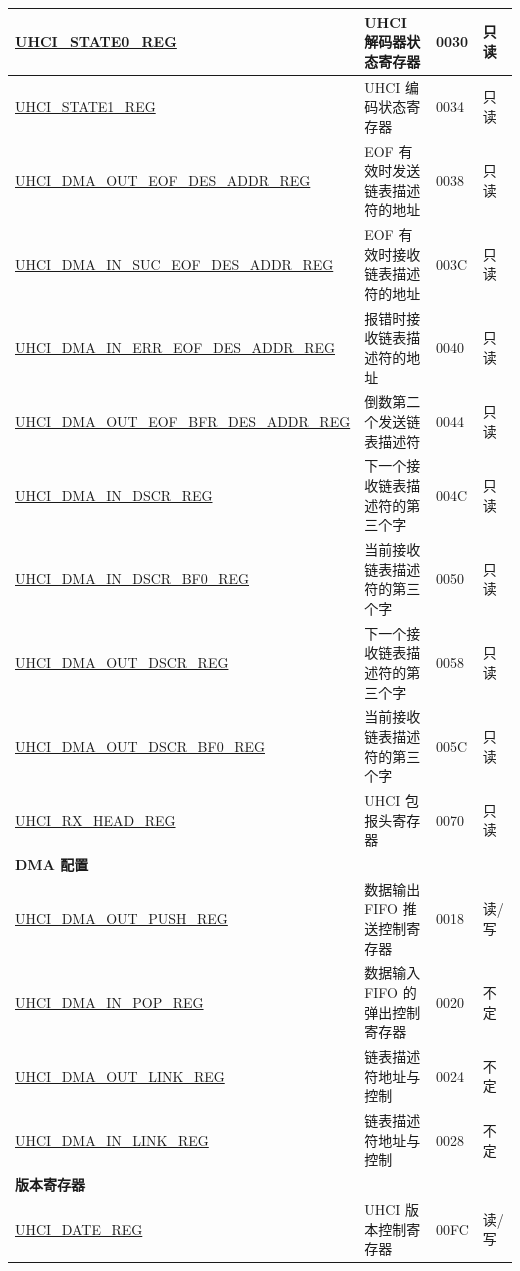 \begin{longtable}{ | p{6cm} | p{7.2cm} | p{1.3cm} | p{1cm} | }
\hyperref[regdesc:UHCISTATE0REG]{UHCI\_STATE0\_REG} & UHCI 解码器状态寄存器 & \hexprefix{}0030 & 只读 \\ \hline
\hyperref[regdesc:UHCISTATE1REG]{UHCI\_STATE1\_REG} & UHCI 编码状态寄存器 & \hexprefix{}0034 & 只读 \\ \hline
\hyperref[regdesc:UHCIDMAOUTEOFDESADDRREG]{UHCI\_DMA\_OUT\_EOF\_DES\_ADDR\newline\_REG} & EOF 有效时发送链表描述符的地址 & \hexprefix{}0038 & 只读 \\ \hline
\hyperref[regdesc:UHCIDMAINSUCEOFDESADDRREG]{UHCI\_DMA\_IN\_SUC\_EOF\_DES\_ADDR\newline\_REG} & EOF 有效时接收链表描述符的地址 & \hexprefix{}003C & 只读 \\ \hline
\hyperref[regdesc:UHCIDMAINERREOFDESADDRREG]{UHCI\_DMA\_IN\_ERR\_EOF\_DES\_ADDR\newline\_REG} & 报错时接收链表描述符的地址 & \hexprefix{}0040 & 只读 \\ \hline
\hyperref[regdesc:UHCIDMAOUTEOFBFRDESADDRREG]{UHCI\_DMA\_OUT\_EOF\_BFR\_DES\_ADDR\newline\_REG} & 倒数第二个发送链表描述符 & \hexprefix{}0044 & 只读 \\ \hline
\hyperref[regdesc:UHCIDMAINDSCRREG]{UHCI\_DMA\_IN\_DSCR\_REG} & 下一个接收链表描述符的第三个字 & \hexprefix{}004C & 只读 \\ \hline
\hyperref[regdesc:UHCIDMAINDSCRBF0REG]{UHCI\_DMA\_IN\_DSCR\_BF0\_REG} & 当前接收链表描述符的第三个字 & \hexprefix{}0050 & 只读 \\ \hline
\hyperref[regdesc:UHCIDMAOUTDSCRREG]{UHCI\_DMA\_OUT\_DSCR\_REG} & 下一个接收链表描述符的第三个字 & \hexprefix{}0058 & 只读 \\ \hline
\hyperref[regdesc:UHCIDMAOUTDSCRBF0REG]{UHCI\_DMA\_OUT\_DSCR\_BF0\_REG} & 当前接收链表描述符的第三个字 & \hexprefix{}005C & 只读 \\ \hline
\hyperref[regdesc:UHCIRXHEADREG]{UHCI\_RX\_HEAD\_REG} & UHCI 包报头寄存器 & \hexprefix{}0070 & 只读 \\ \hline
\multicolumn{4}{|l|}{\textbf{DMA 配置}} \\ \hline
\hyperref[regdesc:UHCIDMAOUTPUSHREG]{UHCI\_DMA\_OUT\_PUSH\_REG} & 数据输出 FIFO 推送控制寄存器 & \hexprefix{}0018 & 读/写 \\ \hline
\hyperref[regdesc:UHCIDMAINPOPREG]{UHCI\_DMA\_IN\_POP\_REG} & 数据输入 FIFO 的弹出控制寄存器 & \hexprefix{}0020 & 不定 \\ \hline
\hyperref[regdesc:UHCIDMAOUTLINKREG]{UHCI\_DMA\_OUT\_LINK\_REG} & 链表描述符地址与控制 & \hexprefix{}0024 & 不定 \\ \hline
\hyperref[regdesc:UHCIDMAINLINKREG]{UHCI\_DMA\_IN\_LINK\_REG} & 链表描述符地址与控制 & \hexprefix{}0028 & 不定 \\ \hline
\multicolumn{4}{|l|}{\textbf{版本寄存器}} \\ \hline
\hyperref[regdesc:UHCIDATEREG]{UHCI\_DATE\_REG} & UHCI 版本控制寄存器 & \hexprefix{}00FC & 读/写 \\ \hline
\end{longtable}
